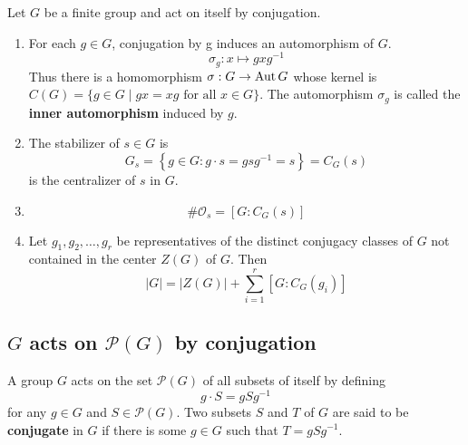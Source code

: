 \begin{proposition}
    Let $G$ be a finite group and act on itself by conjugation.
    \begin{enumerate}
        \item
              For each $g\in G$, conjugation by g induces an automorphism of $G$.
              \begin{equation*}
                  \sigma_g:x\mapsto gxg^{-1}
              \end{equation*}
              Thus there is a homomorphism $\sigma:G \rightarrow \operatorname{\operatorname{Aut}} G $ whose kernel is $C(G)=\{g \in G \mid gx=xg \text{ for all } x \in G\}$.
              The automorphism $\sigma_g$ is called the \textbf{inner automorphism} induced by $g$.

        \item
              The stabilizer of $s \in G$ is
              \begin{equation*}
                  G_s
                  =
                  \left\{g \in G : g\cdot s = g s g^{-1}
                  =
                  s\right\}
                  =
                  C_G(s)
              \end{equation*}
              is the centralizer of $s$ in $G$.

        \item
              \begin{equation*}
                  \# \mathcal{O}_s =\left[G:C_G\left(s\right)\right]
              \end{equation*}

        \item
              Let $g_1, g_2, \ldots, g_r$ be representatives of the distinct conjugacy classes of $G$ not contained in the center $Z(G)$ of $G$. Then
              \begin{equation*}
                  |G|
                  =
                  |Z(G)|+\sum_{i=1}^r\left[G: C_G\left(g_i\right)\right]
              \end{equation*}
    \end{enumerate}
\end{proposition}

\subsection{$G$ acts on $\mathcal{P}(G)$ by conjugation} %
\begin{definition}
    A group $G$ acts on the set $\mathcal{P}(G)$ of all subsets of itself by defining
    \begin{equation*}
        g \cdot S=g S g^{-1}
    \end{equation*}
    for any $g \in G$ and $S \in \mathcal{P}(G)$.
    Two subsets $S$ and $T$ of $G$ are said to be \textbf{conjugate} in $G$ if there is some $g \in G$ such that $T=g S g^{-1}$.
\end{definition}

